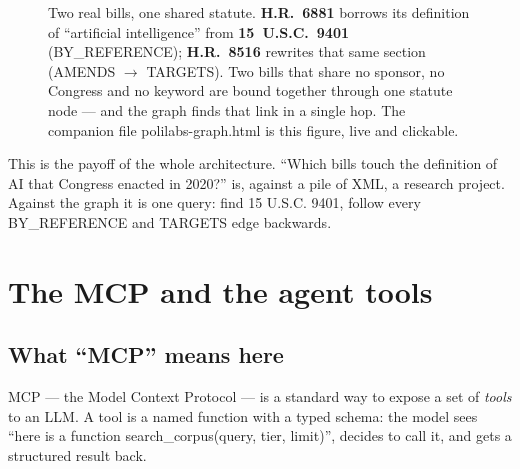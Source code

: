 \documentclass[11pt]{article}
\newcommand{\code}[1]{{\ttfamily\small #1}}
\begin{document}
\begin{figure}[ht]
\caption{Two real bills, one shared statute. \textbf{H.R.~6881} borrows its
definition of ``artificial intelligence'' from \textbf{15~U.S.C.~9401}
(\code{BY\_REFERENCE}); \textbf{H.R.~8516} rewrites that same section
(\code{AMENDS} $\rightarrow$ \code{TARGETS}). Two bills that share no sponsor,
no Congress and no keyword are bound together through one statute node --- and
the graph finds that link in a single hop. The companion file
\code{polilabs-graph.html} is this figure, live and clickable.}
\label{fig:graph}
\end{figure}

This is the payoff of the whole architecture. ``Which bills touch the
definition of AI that Congress enacted in 2020?'' is, against a pile of XML, a
research project. Against the graph it is one query: find
\code{15 U.S.C. 9401}, follow every \code{BY\_REFERENCE} and \code{TARGETS}
edge backwards.

\section{The MCP and the agent tools}

\subsection{What ``MCP'' means here}

MCP --- the Model Context Protocol --- is a standard way to expose a set of
\emph{tools} to an LLM. A tool is a named function with a typed schema: the
model sees ``here is a function \code{search\_corpus(query, tier, limit)}'',
decides to call it, and gets a structured result back.
\end{document}
